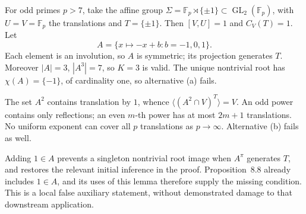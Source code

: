 \documentclass[10pt]{article}
\begin{document}
For odd primes \(p>7\), take the affine group \(\Sigma=\mathbb F_p\rtimes\{\pm1\}\subset\operatorname{GL}_2(\mathbb F_p)\), with \(U=V=\mathbb F_p\) the translations and \(T=\{\pm1\}\). Then \([V,U]=1\) and \(C_V(T)=1\). Let \[A=\{x\mapsto -x+b:b=-1,0,1\}.\] Each element is an involution, so \(A\) is symmetric; its projection generates \(T\). Moreover \(|A|=3\), \(|A^3|=7\), so \(K=3\) is valid. The unique nontrivial root has \(\chi(A)=\{-1\}\), of cardinality one, so alternative (a) fails.\par
The set \(A^2\) contains translation by \(1\), whence \(\langle(A^2\cap V)^T\rangle=V\). An odd power contains only reflections; an even \(m\)-th power has at most \(2m+1\) translations. No uniform exponent can cover all \(p\) translations as \(p\to\infty\). Alternative (b) fails as well.\par
Adding \(1\in A\) prevents a singleton nontrivial root image when \(A^\pi\) generates \(T\), and restores the relevant initial inference in the proof. Proposition 8.8 already includes \(1\in A\), and its uses of this lemma therefore supply the missing condition. This is a local false auxiliary statement, without demonstrated damage to that downstream application.\par
\end{document}
